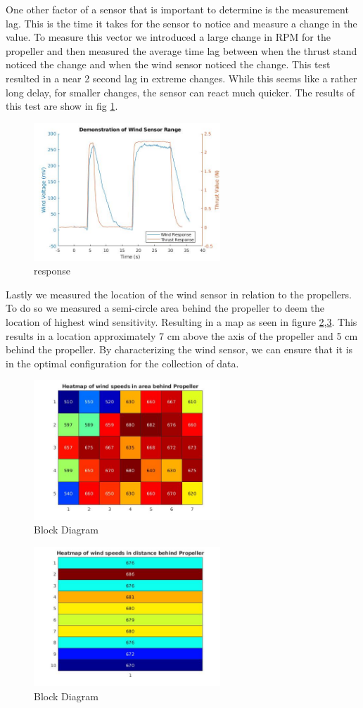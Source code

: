 \documentclass[conference]{IEEEtran}
\begin{document}
One other factor of a sensor that is important to determine is the measurement lag. This is the time it takes for the sensor to notice and measure a change in the value. To measure this vector we introduced a large change in RPM for the propeller and then measured the average time lag between when the thrust stand noticed the change and when the wind sensor noticed the change. This test resulted in a near 2 second lag in extreme changes. While this seems like a rather long delay, for smaller changes, the sensor can react much quicker. The results of this test are show in fig \ref{response}.
	\begin{figure}[htbp]
	\includegraphics[width=7cm]{images/figure_1/response.jpg}
	\caption{response}
	\label{response}
\end{figure}
Lastly we measured the location of the wind sensor in relation to the propellers. To do so we measured a semi-circle area behind the propeller to deem the location of highest wind sensitivity. Resulting in a map as seen in figure \ref{area},\ref{dist}. This results in a location approximately 7 cm above the axis of the propeller and 5 cm behind the propeller.
By characterizing the wind sensor, we can ensure that it is in the optimal configuration for the collection of data.
	\begin{figure}[htbp]
	\includegraphics[width=7cm]{images/figure_1/area_heatmap.jpg}
	\caption{Block Diagram}
	\label{area}
\end{figure}
\begin{figure}[htbp]
	\includegraphics[width = 7cm]{images/figure_1/dist_heatmap.jpg}
	\caption{Block Diagram}
	\label{dist}
\end{figure}
\end{document}
